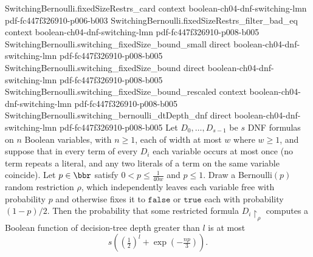 \begin{theorem}
\proofstep
  {SwitchingBernoulli.fixedSizeRestrs_card}
  {context}
  {boolean-ch04-dnf-switching-lmn}
  {pdf-fc447f326910-p006-b003}
\proofstep
  {SwitchingBernoulli.fixedSizeRestrs_filter_bad_eq}
  {context}
  {boolean-ch04-dnf-switching-lmn}
  {pdf-fc447f326910-p008-b005}
\proofstep
  {SwitchingBernoulli.switching_fixedSize_bound_small}
  {direct}
  {boolean-ch04-dnf-switching-lmn}
  {pdf-fc447f326910-p008-b005}
\proofstep
  {SwitchingBernoulli.switching_fixedSize_bound}
  {direct}
  {boolean-ch04-dnf-switching-lmn}
  {pdf-fc447f326910-p008-b005}
\proofstep
  {SwitchingBernoulli.switching_fixedSize_bound_rescaled}
  {context}
  {boolean-ch04-dnf-switching-lmn}
  {pdf-fc447f326910-p008-b005}
\proofstep
  {SwitchingBernoulli.switching_bernoulli_dtDepth_dnf}
  {direct}
  {boolean-ch04-dnf-switching-lmn}
  {pdf-fc447f326910-p008-b005}
Let $D_0,\dots,D_{s-1}$ be $s$ DNF formulas on $n$ Boolean variables, with $n \ge 1$,
each of width at most $w$ where $w \ge 1$, and suppose that in every term of every $D_i$
each variable occurs at most once (no term repeats a literal, and any two literals of a
term on the same variable coincide). Let $p \in \bbr$ satisfy $0 < p \le \tfrac{1}{40w}$
and $p \le 1$. Draw a Bernoulli$(p)$ random restriction $\rho$, which independently
leaves each variable free with probability $p$ and otherwise fixes it to
$\mathtt{false}$ or $\mathtt{true}$ each with probability $(1-p)/2$. Then the
probability that some restricted formula $D_i\!\restriction_\rho$ computes a Boolean
function of decision-tree depth greater than $l$ is at most
\[
  s\left(\left(\tfrac12\right)^{l} + \exp\!\left(-\tfrac{np}{3}\right)\right).
\]
\end{theorem}

